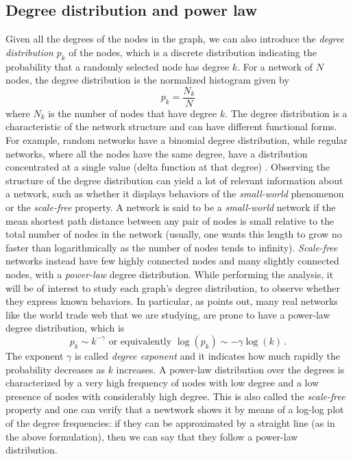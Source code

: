 \subsection{Degree distribution and power law}
Given all the degrees of the nodes in the graph, we can also introduce the \textit{degree distribution} $p_k$ of the nodes, which is a discrete distribution indicating the probability that a randomly selected node has degree $k$. For a network of $N$ nodes, the degree distribution is the normalized histogram given by 
\[ 
    p_k = \frac{N_k}{N} 
\]
where $N_k$ is the number of nodes that have degree $k$. 
The degree distribution is a characteristic of the network structure and can have different functional forms. For example, random networks have a binomial degree distribution, while regular networks, where all the nodes have the same degree, have a distribution concentrated at a single value (delta function at that degree) \cite{sajedianfard2021quantitative}. Observing the structure of the degree distribution can yield a lot of relevant information about a network, such as whether it displays behaviors of the \textit{small-world} phenomenon or the \textit{scale-free} property. A network is said to be a \textit{small-world} network if the mean shortest path distance between any pair of nodes is small relative to the total number of nodes in the network (usually, one wants this length to grow no faster than logarithmically as the number of nodes tends to infinity). \textit{Scale-free} networks instead have few highly connected nodes and many slightly connected nodes, with a \textit{power-law} degree distribution.
While performing the analysis, it will be of interest to study each graph's degree distribution, to observe whether they express known behaviors. In particular, as \textcite{barabasi2016network} points out, many real networks like the world trade web that we are studying, are prone to have a power-law degree distribution, which is
\[
    p_k \sim k^{-\gamma} \text{ or equivalently } \log(p_k) \sim -\gamma \log(k) \,.
\]
The exponent $\gamma$ is called \textit{degree exponent} and it indicates how much rapidly the probability decreases as $k$ increases. A power-law distribution over the degrees is characterized by a very high frequency of nodes with low degree and a low presence of nodes with considerably high degree. This is also called the \textit{scale-free} property and one can verify that a newtwork shows it by means of a log-log plot of the degree frequencies: if they can be approximated by a straight line (as in the above formulation), then we can say that they follow a power-law distribution.
